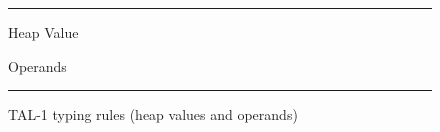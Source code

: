 \documentclass[a4paper,oneside]{ltjsarticle}
\newenvironment{linedenv}%
{\begin{minipage}{\textwidth}
    \noindent\hrule{}}%
    {\noindent\hrule{}
\end{minipage}}
\newenvironment{boxedenv}%
{\begin{linedenv}
    \begin{multicols}{2}}%
    {\end{multicols}
\end{linedenv}}
\begin{document}
\begin{figure}
    \begin{boxedenv}
        \begin{center}
            Heap Value \hfill \fbox{$\Psi\vdash \nu:\tau$}


            Operands \hfill \fbox{$\Psi\vdash \nu:\tau$}

        \end{center}
    \end{boxedenv}
    \caption{TAL-1 typing rules (heap values and operands)}
    \label{fig:tal1htyprule}
\end{figure}
\end{document}
